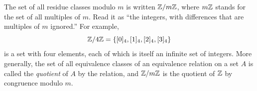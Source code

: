 
The set of all residue classes modulo $m$ is written $\mathbb Z/m\mathbb Z$, where $m\mathbb Z$ stands for the set of all multiples of $m$. Read it as ``the integers, with differences that are multiples of $m$ ignored.'' For example,
\[
\mathbb Z/4\mathbb Z=\{[0]_4,[1]_4,[2]_4,[3]_4\}
\]
is a set with four elements, each of which is itself an infinite set of integers. More generally, the set of all equivalence classes of an equivalence relation on a set $A$ is called the \emph{quotient} of $A$ by the relation, and $\mathbb Z/m\mathbb Z$ is the quotient of $\mathbb Z$ by congruence modulo $m$.
